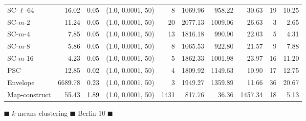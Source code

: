 \documentclass[11pt]{article}
\begin{document}
\begin{figure}
\begin{center}
\begin{minipage}{\textwidth}
{\begin{tabular}{@{}lrrcrrrrrr@{}}
        SC-$\ell$-64 & 16.02 & 0.05 & (1.0, 0.0001, 50) & 8 & 1069.96 & 958.22 & 30.63 & 19 & 10.25\\
        SC-$m$-2 & 11.24 & 0.05 & (1.0, 0.0001, 50) & 20 & 2077.13 & 1009.06 & 26.63 & 3 & 2.65\\
        SC-$m$-4 & 7.85 & 0.05 & (1.0, 0.0001, 50) & 13 & 1816.18 & 990.90 & 22.03 & 5 & 4.31\\
        SC-$m$-8 & 5.86 & 0.05 & (1.0, 0.0001, 50) & 8 & 1065.53 & 922.80 & 21.57 & 9 & 7.88\\
        SC-$m$-16 & 4.23 & 0.05 & (1.0, 0.0001, 50) & 5 & 1862.33 & 1001.98 & 23.97 & 16 & 11.20\\
        PSC & 12.85 & 0.02 & (1.0, 0.0001, 50) & 4 & 1809.92 & 1149.63 & 10.90 & 17 & 12.75\\
        Envelope & 6689.78 & 0.23 & (1.0, 0.0001, 50) & 3 & 1949.27 & 1359.89 & 11.66 & 36 & 20.67\\
        Map-construct & 55.43 & 1.89 & (1.0, 0.0001, 50) & 1431 & 817.76 & 36.36 & 1457.34 & 18 & 5.13\\
        \bottomrule
    \end{tabular}
    }
\end{minipage}
\end{center}
        \caption{$\blacksquare$ $k$-means clustering $\blacksquare$ Berlin-10 $\blacksquare$}
 \end{figure}
\clearpage
\newpage 
%
%
\clearpage
\end{document}
